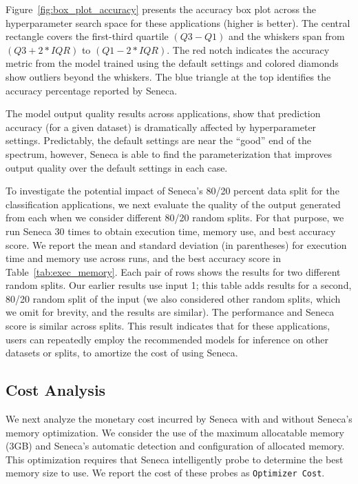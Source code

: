 Figure~\ref{fig:box_plot_accuracy} presents the accuracy box plot across the hyperparameter search space for these applications (higher is better).  
The central rectangle covers the first-third quartile
\texttt{$(Q3 - Q1)$} and the whiskers span from \texttt{$(Q3 + 2 * IQR)$} to \texttt{$(Q1 - 2 * IQR)$}.
The red notch indicates the accuracy metric from the model trained using the default
settings and colored diamonds show outliers beyond the whiskers.
The blue triangle at the top identifies the accuracy percentage reported by Seneca.

The model output quality results across applications, show that prediction
accuracy (for a given dataset) is dramatically
affected by hyperparameter settings.  Predictably, the default settings are
near the ``good'' end of the spectrum, however, Seneca is able to find the
parameterization that improves output quality over the default settings
in each case.

To investigate the potential impact of Seneca's 80/20 percent data split for the classification
applications, we next evaluate the quality of the output generated from 
each when we consider different 80/20 random splits.
For that purpose, we run Seneca 30 times to obtain execution time, memory use, 
and best accuracy score. We report the
mean and standard deviation (in parentheses) 
for execution time and memory use across runs,
and the best accuracy score in
Table~\ref{tab:exec_memory}. Each pair of rows shows the results for two different random splits.
Our earlier results use input 1; this table adds results for a second, 80/20 
random split of the input (we also considered other random splits, which we omit for brevity, 
and the results are similar).  The performance and Seneca score is similar across splits. 
This result indicates that for these applications, 
users can repeatedly employ the recommended models for inference on other datasets or splits,
to amortize the cost of using Seneca.

\subsection{Cost Analysis}

We next analyze the monetary cost incurred by Seneca with and without 
Seneca's memory optimization.
We consider the use of the maximum allocatable memory (3GB) and Seneca's 
automatic detection and configuration of allocated memory.
This optimization requires
that Seneca intelligently probe to determine the best memory size 
to use.  We report the cost of these probes as \texttt{Optimizer Cost}.

